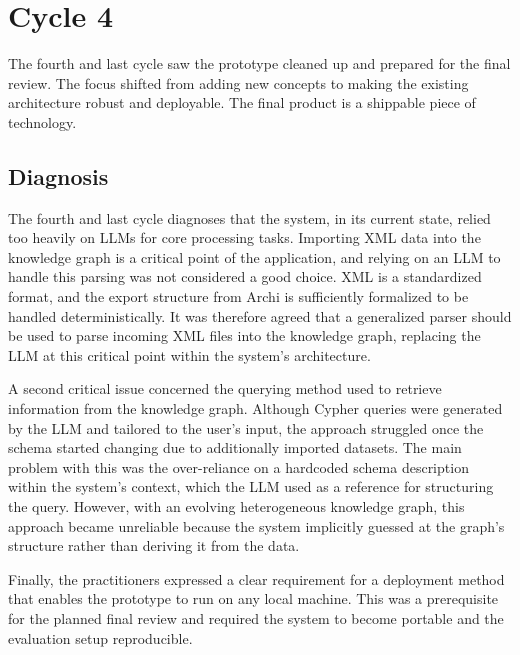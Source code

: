 \chapter{Cycle 4}
\label{ch:cycle4}
The fourth and last cycle saw the prototype cleaned up and prepared for the final review. The focus shifted from adding new concepts to making the existing architecture robust and deployable. The final product is a shippable piece of technology.

\section{Diagnosis}
\label{sec:cycle4_diagnosis}

The fourth and last cycle diagnoses that the system, in its current state, relied too heavily on LLMs for core processing tasks. Importing XML data into the knowledge graph is a critical point of the application, and relying on an LLM to handle this parsing was not considered a good choice. XML is a standardized format, and the export structure from Archi is sufficiently formalized to be handled deterministically. It was therefore agreed that a generalized parser should be used to parse incoming XML files into the knowledge graph, replacing the LLM at this critical point within the system's architecture.

A second critical issue concerned the querying method used to retrieve information from the knowledge graph. Although Cypher queries were generated by the LLM and tailored to the user's input, the approach struggled once the schema started changing due to additionally imported datasets. The main problem with this was the over-reliance on a hardcoded schema description within the system's context, which the LLM used as a reference for structuring the query. However, with an evolving heterogeneous knowledge graph, this approach became unreliable because the system implicitly guessed at the graph's structure rather than deriving it from the data.

Finally, the practitioners expressed a clear requirement for a deployment method that enables the prototype to run on any local machine. This was a prerequisite for the planned final review and required the system to become portable and the evaluation setup reproducible.

